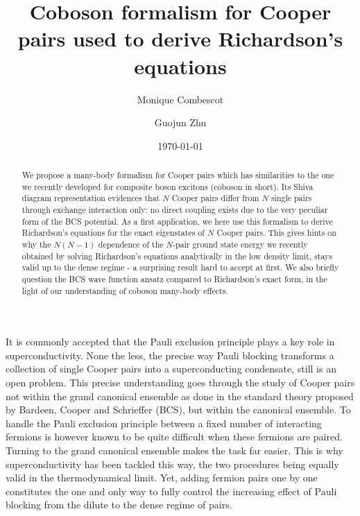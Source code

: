 \documentclass[aps,prb,superscriptaddress,showpacs,reprint,lengthcheck]{revtex4}
\begin{document}
\title{Coboson formalism for Cooper pairs used to derive Richardson's equations}
\author{Monique Combescot}
\author{Guojun Zhu}

\date{\today}

\begin{abstract}
We propose a many-body formalism for Cooper pairs  which has similarities  to the one we recently developed for  composite boson excitons (coboson in short). Its Shiva diagram representation evidences that  $N$ Cooper pairs differ from $N$ single pairs through exchange interaction only: no direct coupling exists due to the very peculiar form of the BCS potential. As a first application, we here use this formalism to derive Richardson's equations for the exact eigenstates of $N$ Cooper pairs. This gives hints on
why the $N(N-1)$ dependence of the $N$-pair ground state energy we recently obtained by solving Richardson's equations analytically in the low density limit, stays valid up to the dense regime - a surprising result hard to accept at first. We also briefly question the BCS wave
function ansatz compared to Richardson's exact form, in the light of our understanding of coboson many-body effects. 
\end{abstract}

\maketitle


It is commonly accepted that the Pauli exclusion principle
plays a key role in superconductivity. None the less, the
precise way Pauli blocking transforms a collection of single Cooper pairs into a superconducting
condensate, still is an open problem. This precise understanding goes through
the study of Cooper pairs not within the grand canonical ensemble as done in the
standard theory proposed by Bardeen, Cooper and Schrieffer (BCS), but within the canonical ensemble. To handle the
Pauli exclusion principle between a fixed number of interacting fermions is however  known  to be quite difficult when these fermions are paired. 
Turning to the grand canonical ensemble makes the task far easier. This is why superconductivity has been tackled this way, the two procedures being equally valid in the thermodynamical limit. Yet, adding fermion pairs one by
one constitutes the one and only way to fully control the increasing effect of Pauli
blocking from the dilute to the dense regime of pairs.
\end{document}
